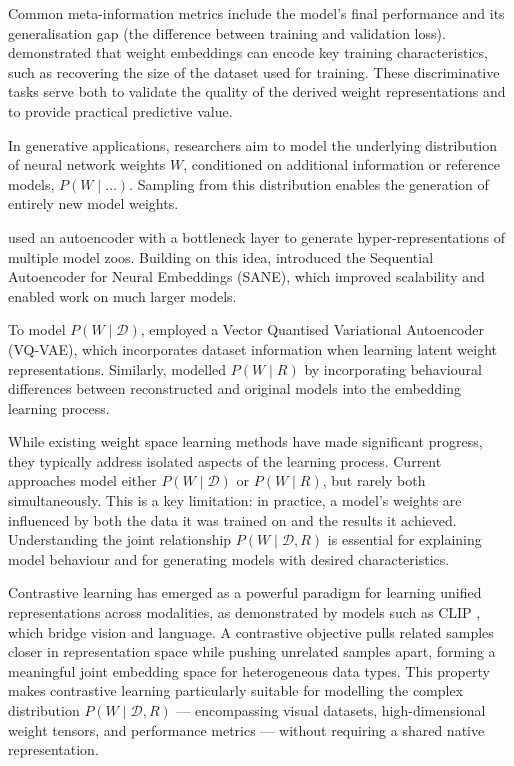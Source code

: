 Common meta-information metrics include the model's final performance and its generalisation gap (the difference between training and validation loss). \cite{salama2024datasetsizerecoverylora} demonstrated that weight embeddings can encode key training characteristics, such as recovering the size of the dataset used for training. These discriminative tasks serve both to validate the quality of the derived weight representations and to provide practical predictive value.

In generative applications, researchers aim to model the underlying distribution of neural network weights \( W \), conditioned on additional information or reference models, \( P(W \mid \dots) \). Sampling from this distribution enables the generation of entirely new model weights.

\cite{schurholt2022hyperrepresentationsgenerativemodelssampling} used an autoencoder with a bottleneck layer to generate hyper-representations of multiple model zoos. Building on this idea, \cite{pmlr-v235-schurholt24a} introduced the Sequential Autoencoder for Neural Embeddings (SANE), which improved scalability and enabled work on much larger models.

To model \( P(W \mid \mathcal{D}) \), \cite{bedionita2025instructionguidedautoregressiveneuralnetwork} employed a Vector Quantised Variational Autoencoder (VQ-VAE), which incorporates dataset information when learning latent weight representations. Similarly, \cite{meynent2025structureenoughleveragingbehavior} modelled \( P(W \mid R) \) by incorporating behavioural differences between reconstructed and original models into the embedding learning process.

While existing weight space learning methods have made significant progress, they typically address isolated aspects of the learning process. Current approaches model either \( P(W \mid \mathcal{D}) \) or \( P(W \mid R) \), but rarely both simultaneously. This is a key limitation: in practice, a model's weights are influenced by both the data it was trained on and the results it achieved. Understanding the joint relationship \( P(W \mid \mathcal{D}, R) \) is essential for explaining model behaviour and for generating models with desired characteristics.

Contrastive learning has emerged as a powerful paradigm for learning unified representations across modalities, as demonstrated by models such as CLIP \cite{radford2021learningtransferablevisualmodels}, which bridge vision and language. A contrastive objective pulls related samples closer in representation space while pushing unrelated samples apart, forming a meaningful joint embedding space for heterogeneous data types. This property makes contrastive learning particularly suitable for modelling the complex distribution \( P(W \mid \mathcal{D}, R) \) --- encompassing visual datasets, high-dimensional weight tensors, and performance metrics --- without requiring a shared native representation.

